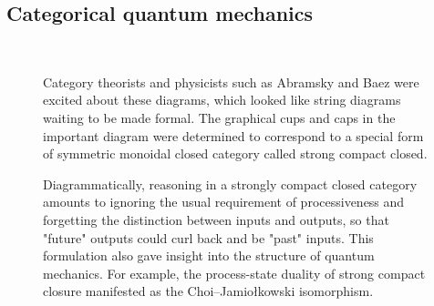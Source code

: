 \subsection{Categorical quantum mechanics}\\

\begin{figure}[h!]
\centering
{}
\caption{Category theorists and physicists such as Abramsky and Baez were excited about these diagrams, which looked like string diagrams waiting to be made formal. The graphical cups and caps in the important diagram were determined to correspond to a special form of symmetric monoidal closed category called strong compact closed.}
\end{figure}

\begin{figure}[h!]
\centering
{}
\caption{Diagrammatically, reasoning in a strongly compact closed category amounts to ignoring the usual requirement of processiveness and forgetting the distinction between inputs and outputs, so that "future" outputs could curl back and be "past" inputs. This formulation also gave insight into the structure of quantum mechanics. For example, the process-state duality of strong compact closure manifested as the Choi–Jamiołkowski isomorphism.}
\end{figure}

